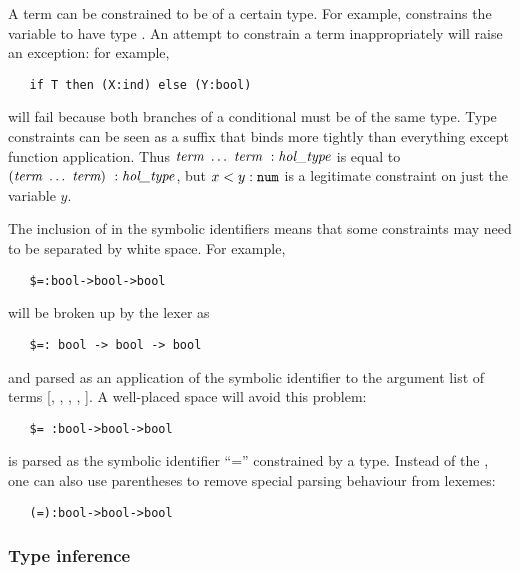 {A term can be constrained to be of a certain type.  For example,
 constrains the variable  to have type
. An attempt to constrain a
term inappropriately will raise an exception: for example,
\begin{hol}
\begin{verbatim}
   if T then (X:ind) else (Y:bool)
\end{verbatim}
\end{hol}
will fail because both branches of a conditional must be of the same
type.  Type constraints can be seen as a suffix that binds more
tightly than everything except function application.  Thus $\mbox{\it term}\
\ldots\ \mbox{\it term} \ : \mbox{\it hol\_type}$ is equal to $(\mbox{\it term}\ \ldots\ \mbox{\it term})\ :
\mbox{\it hol\_type}$, but $x < y:\holtxt{num}$ is a legitimate constraint on just
the variable $y$.

The inclusion of \holtxt{:} in the symbolic identifiers means that some
constraints may need to be separated by white space. For example,
\begin{hol}
\begin{verbatim}
   $=:bool->bool->bool
\end{verbatim}
\end{hol}
will be broken up by the \HOL{} lexer as
\begin{hol}
\begin{verbatim}
   $=: bool -> bool -> bool
\end{verbatim}
\end{hol}
and parsed as an application of the symbolic identifier \holtxt{\$=:} to
the argument list of terms [, \holtxt{->}, \holtxt{bool},
\holtxt{->}, \holtxt{bool}]. A well-placed space will avoid this problem:
\begin{hol}
\begin{verbatim}
   $= :bool->bool->bool
\end{verbatim}
\end{hol}
is parsed as the symbolic identifier ``='' constrained by a type.
Instead of the \holtxt{\$}, one can also use parentheses to remove
special parsing behaviour from lexemes:
\begin{hol}
\begin{verbatim}
   (=):bool->bool->bool
\end{verbatim}
\end{hol}

\subsubsection{Type inference}

}
